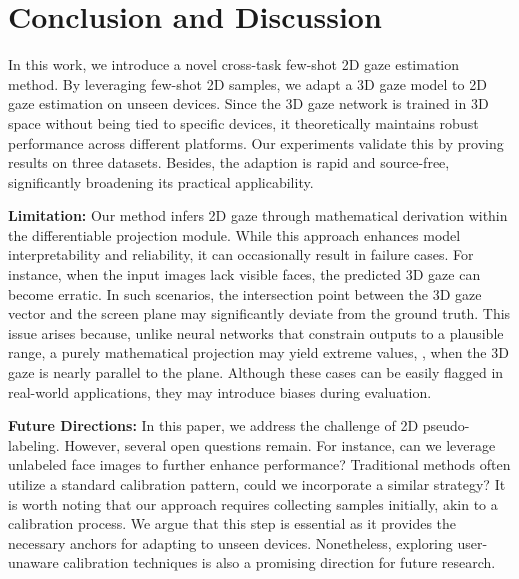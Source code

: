 \section{Conclusion and Discussion}
In this work, we introduce a novel cross-task few-shot 2D gaze estimation method. By leveraging few-shot 2D samples, we adapt a 3D gaze model to 2D gaze estimation on unseen devices. Since the 3D gaze network is trained in 3D space without being tied to specific devices, it theoretically maintains robust performance across different platforms. Our experiments validate this by proving results on three datasets. Besides, the adaption is rapid and source-free, significantly broadening its practical applicability.

\noindent \textbf{Limitation:} Our method infers 2D gaze through mathematical derivation within the differentiable projection module. While this approach enhances model interpretability and reliability, it can occasionally result in failure cases. For instance, when the input images lack visible faces, the predicted 3D gaze can become erratic. In such scenarios, the intersection point between the 3D gaze vector and the screen plane may significantly deviate from the ground truth. This issue arises because, unlike neural networks that constrain outputs to a plausible range, a purely mathematical projection may yield extreme values, \eg, when the 3D gaze is nearly parallel to the plane. Although these cases can be easily flagged in real-world applications, they may introduce biases during evaluation.

\noindent \textbf{Future Directions:} 
In this paper, we address the challenge of 2D pseudo-labeling. However, several open questions remain. For instance, can we leverage unlabeled face images to further enhance performance? Traditional methods often utilize a standard calibration pattern, could we incorporate a similar strategy? It is worth noting that our approach requires collecting samples initially, akin to a calibration process. We argue that this step is essential as it provides the necessary anchors for adapting to unseen devices. Nonetheless, exploring user-unaware calibration techniques is also a promising direction for future research.


